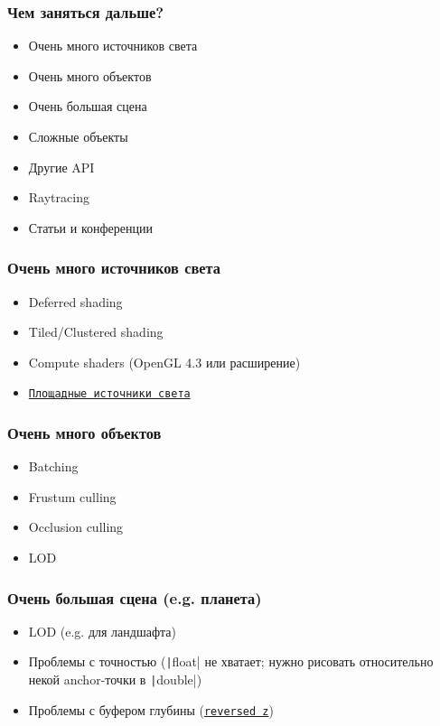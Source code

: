 \documentclass{beamer}
\begin{document}
\begin{frame}[fragile]
\frametitle{Чем заняться дальше?}
\begin{itemize}
\item Очень много источников света
\item Очень много объектов
\item Очень большая сцена
\item Сложные объекты
\item Другие API
\item Raytracing
\item Статьи и конференции
\end{itemize}
\end{frame}

\begin{frame}[fragile]
\frametitle{Очень много источников света}
\begin{itemize}
\item Deferred shading
\item Tiled/Clustered shading
\item Compute shaders (OpenGL 4.3 или расширение)
\item \href{https://learnopengl.com/Guest-Articles/2022/Area-Lights}{\texttt{Площадные источники света}}
\end{itemize}
\end{frame}

\begin{frame}[fragile]
\frametitle{Очень много объектов}
\begin{itemize}
\item Batching
\item Frustum culling
\item Occlusion culling
\item LOD
\end{itemize}
\end{frame}

\begin{frame}[fragile]
\frametitle{Очень большая сцена (e.g. планета)}
\begin{itemize}
\item LOD (e.g. для ландшафта)
\item Проблемы с точностью (\texttt|float| не хватает; нужно рисовать относительно некой anchor-точки в \texttt|double|)
\item Проблемы с буфером глубины (\href{https://nlguillemot.wordpress.com/2016/12/07/reversed-z-in-opengl/}{\texttt{reversed z}})
\end{itemize}
\end{frame}
\end{document}
